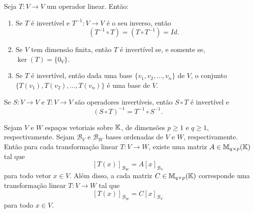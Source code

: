 \documentclass{beamer}
\begin{document}
\begin{frame}
    \begin{proposicao}
        Seja $T \colon V \to V$ um operador linear.  Então:
        \begin{enumerate}[label={\roman*})]
            \item Se $T$ é invertível  e $T^{-1} \colon V \to V$ é o seu inverso,  então
                \[
                    (T^{-1} \circ T) =  (T \circ T^{-1}) =  Id.
                \]

            \vspace{.5cm}

            \item Se $V$ tem dimensão finita,  então $T$ é invertível  se, e somente se,  $\ker(T) = \{0_V\}$.

            \vspace{.5cm}

            \item Se $T$ é invertível,  então dada uma base $\{v_1, v_2, \dots, v_n\}$ de $V$,  o conjunto $\{T(v_1),  T(v_2),  \dots, T(v_n)\}$  é uma base de $V$.
        \end{enumerate}
    \end{proposicao}
\end{frame}

\begin{frame}
    \begin{proposicao}
        Se $S \colon V \to V$ e $T \colon V \to V$  são operadores invertíveis,  então $S \circ T$ é invertível e
        \[
            (S \circ T)^{-1}  = T^{-1}  \circ S^{-1}.
        \]
    \end{proposicao}
\end{frame}

\begin{frame}
    \begin{teorema}\label{teorema_toda_transformacao_matriz}
        Sejam $V$ e $W$ espaços vetoriais sobre $\mathbb{K}$,  de dimensões $p \ge 1$ e $q \ge 1$, respectivamente.  Sejam $\mathcal{B}_V$ e $\mathcal{B}_W$ bases ordenadas de $V$ e $W$, respectivamente.  Então para cada transformação linear $T \colon V \to W$,  existe uma matriz $A \in \mathbb{M}_{q\times p}(\mathbb{K})$ tal que
        \[
            [T(x)]_{\mathcal{B}_W}  = A[x]_{\mathcal{B}_V}
        \]
        para todo vetor $x \in V$.  Além disso,  a cada matriz $C \in \mathbb{M}_{q\times p}(\mathbb{K})$  corresponde uma transformação linear $T \colon V \to W$ tal que
        \[
            [T(x)]_{\mathcal{B}_W}  = C[x]_{\mathcal{B}_V}
        \]
        para todo $x \in V$.
    \end{teorema}
\end{frame}
\end{document}
